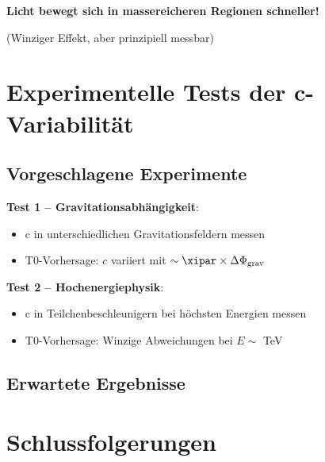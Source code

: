	\textbf{Licht bewegt sich in massereicheren Regionen schneller!}
	
	(Winziger Effekt, aber prinzipiell messbar)
	
	\section{Experimentelle Tests der c-Variabilität}
	
	\subsection{Vorgeschlagene Experimente}
	
	\textbf{Test 1 – Gravitationsabhängigkeit}:
	\begin{itemize}
		\item c in unterschiedlichen Gravitationsfeldern messen
		\item T0-Vorhersage: $c$ variiert mit $\sim \xipar \times \Delta\Phi_{\text{grav}}$
	\end{itemize}

	\textbf{Test 2 – Hochenergiephysik}:
	\begin{itemize}
		\item c in Teilchenbeschleunigern bei höchsten Energien messen
		\item T0-Vorhersage: Winzige Abweichungen bei $E \sim$ TeV
	\end{itemize}
	
	\subsection{Erwartete Ergebnisse}
	
	\begin{table}[htbp]
		\centering
		\caption{Vorhergesagte c-Variationen}
	\end{table}
	
	\section{Schlussfolgerungen}
	
